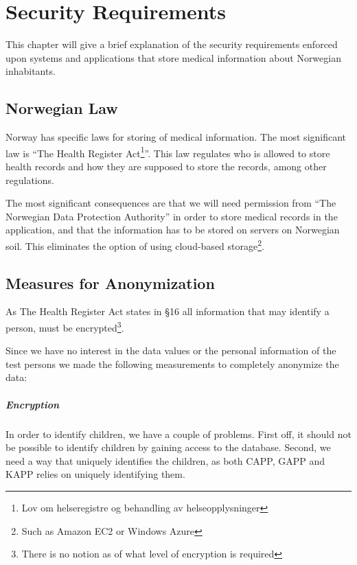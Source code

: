 \chapter{Security Requirements}
\label{chp:securityrequirements}

This chapter will give a brief explanation of the security requirements enforced upon systems and applications that store medical information about Norwegian inhabitants. 


\section{Norwegian Law}
\label{sec:helseregisterloven}

Norway has specific laws for storing of medical information. The most significant law is ``The Health Register Act\footnote{Lov om helseregistre og behandling av helseopplysninger}''\cite{helseregisterloven}. This law regulates who is allowed to store health records and how they are supposed to store the records, among other regulations. 

The most significant consequences are that we will need permission from ``The Norwegian Data Protection Authority'' in order to store medical records in the application, and that the information has to be stored on servers on Norwegian soil. This eliminates the option of using cloud-based storage\footnote{Such as Amazon EC2 or Windows Azure}. 


\section{Measures for Anonymization}
As The Health Register Act states in \S 16 \cite{helseregisterloven} all information that may identify a person, must be encrypted\footnote{There is no notion as of what level of encryption is required}. 

Since we have no interest in the data values or the personal information of the test persons we made the following measurements to completely anonymize the data:

\paragraph{Encryption}
In order to identify children, we have a couple of problems. First off, it should not be possible to identify children by gaining access to the database. Second, we need a way that uniquely identifies the children, as both CAPP, GAPP and KAPP relies on uniquely identifying them. 

